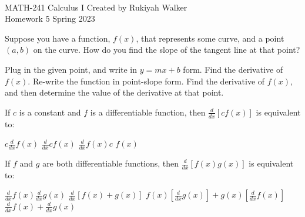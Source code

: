 \documentclass[addpoints, 12pt]{exam}%
\newcommand{\spc}{\vspace*{0.5cm}}
\begin{document}
\noindent \hrulefill \\
	MATH-241 Calculus I \hfill Created by Rukiyah Walker\\
	Homework 5 \hfill Spring 2023\\ \vspace*{-1cm}
 
	\noindent\hrulefill


\begin{questions}

\vspace*{1cm}

\question[1]

Suppose you have a function, $f(x)$, that represents some curve, and a point $(a, b)$ on the curve. How do you find the slope of the tangent line at that point?

\begin{choices}
\choice Plug in the given point, and write in $y = mx + b$ form.
\choice Find the derivative of $f(x)$.
\choice Re-write the function in point-slope form.
\CorrectChoice Find the derivative of $f(x)$, and then determine the value of the derivative at that point.
\end{choices}

\spc

\question[1]

If $c$ is a constant and $f$ is a differentiable function, then $\frac{d}{dx}[cf(x)]$ is equivalent to:

\begin{choices}
\CorrectChoice $c\frac{d}{dx}f(x)$
\choice $\frac{d}{dx}cf(x)$
\choice $\frac{d}{dx}f(x)c$
\choice $f(x)$
\end{choices}

\spc

\question[1]

If $f$ and $g$ are both differentiable functions, then $\frac{d}{dx}[f(x)g(x)]$ is equivalent to:

\begin{choices}
\choice $\frac{d}{dx}f(x)\frac{d}{dx}g(x)$
\choice $\frac{d}{dx}[f(x) + g(x)]$
\CorrectChoice $f(x)[\frac{d}{dx}g(x)] + g(x)[\frac{d}{dx}f(x)]$
\choice $\frac{d}{dx}f(x) + \frac{d}{dx}g(x)$
\end{choices}


\end{questions}
\end{document}
